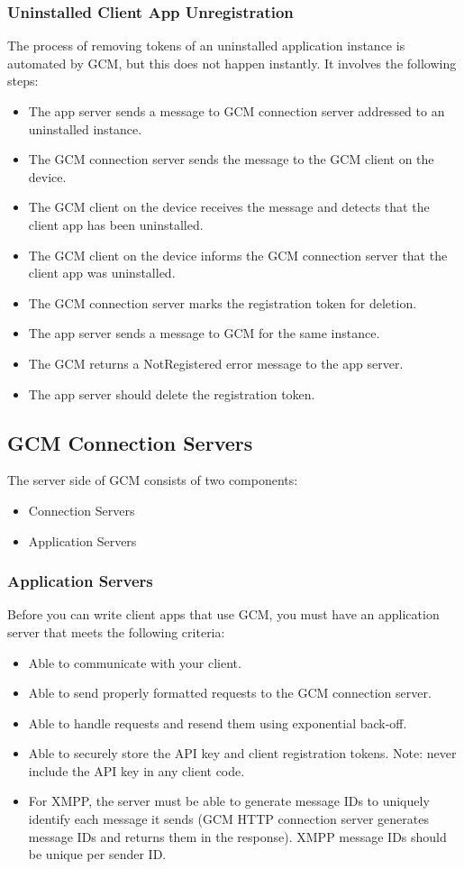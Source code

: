 \subsubsection{Uninstalled Client App Unregistration}
The process of removing tokens of an uninstalled application instance is automated by GCM, but this does not happen instantly. It involves the following steps:
\begin{itemize}
	\item The app server sends a message to GCM connection server addressed to an uninstalled instance.
	\item The GCM connection server sends the message to the GCM client on the device.
	\item The GCM client on the device receives the message and detects that the client app has been uninstalled.
	\item The GCM client on the device informs the GCM connection server that the client app was uninstalled.
	\item The GCM connection server marks the registration token for deletion.
	\item The app server sends a message to GCM for the same instance.
	\item The GCM returns a NotRegistered error message to the app server.
	\item The app server should delete the registration token.
\end{itemize}
\subsection{GCM Connection Servers}
The server side of GCM consists of two components:
\begin{itemize}
	\item Connection Servers 
	\item Application Servers
\end{itemize}
\subsubsection{Application Servers}
Before you can write client apps that use GCM, you must have an application server that meets the following criteria:
\begin{itemize}
	\item Able to communicate with your client.
	\item Able to send properly formatted requests to the GCM connection server.
	\item Able to handle requests and resend them using exponential back-off.
	\item Able to securely store the API key and client registration tokens. Note: never include the API key in any client code.
	\item For XMPP, the server must be able to generate message IDs to uniquely identify each message it sends (GCM HTTP connection server generates message IDs and returns them in the response). XMPP message IDs should be unique per sender ID.
\end{itemize}
